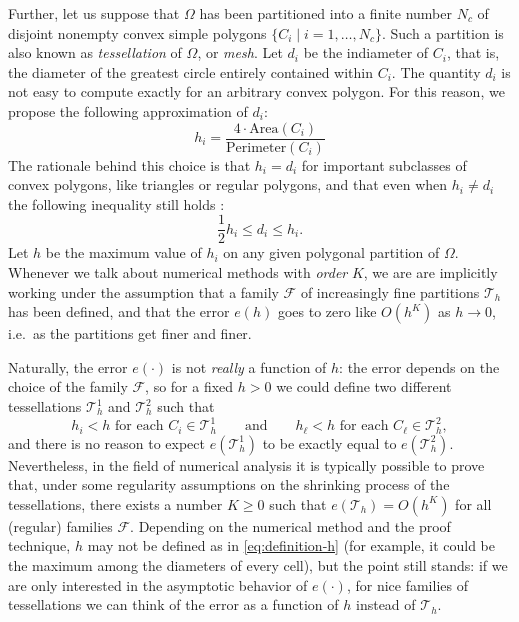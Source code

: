 Further, let us suppose that $\Omega$ has been partitioned into a
finite number $N_{c}$ of disjoint nonempty convex simple polygons
$\{C_{i} \mid i=1,\dots, N_{c}\}$. Such a partition is also known as
\emph{tessellation} of $\Omega$, or \emph{mesh}.
Let $d_{i}$ be the indiameter of $C_{i}$, that is, the diameter of the
greatest circle entirely contained within $C_{i}$.
The quantity $d_{i}$ is not easy to compute exactly for an arbitrary
convex polygon. For this reason, we propose the following
approximation of $d_{i}$:
\begin{equation} \label{eq:definition-h}
h_{i} = \frac{4 \cdot \text{Area}(C_{i})}{\text{Perimeter}(C_{i})}
\end{equation}
The rationale behind this choice is that $h_{i} = d_{i}$ for important subclasses
of convex polygons, like triangles or regular polygons, and that even
when $h_{i} \neq d_{i}$ the following inequality still holds
\cite{scott2000inequalities}:
\[
\frac{1}{2}h_{i}\leq d_{i} \leq h_{i}.
\]
Let $h$ be the maximum value of $h_{i}$ on any
given polygonal partition of $\Omega$.
Whenever we talk about numerical methods with \emph{order} $K$,
we are are implicitly working under the assumption
that a family $\mathcal{F}$ of increasingly fine partitions $\mathcal{T}_{h}$
has been defined, and that the error $e(h)$ goes to zero like $O(h^K)$
as $h \to 0$, i.e.\ as the partitions get finer and finer.

Naturally, the error $e(\cdot)$ is not \emph{really} a function of $h$:
the error depends on the choice of the family $\mathcal{F}$,
so for a fixed $h > 0$ we could define two different tessellations
$\mathcal{T}_{h}^1$ and $\mathcal{T}_{h}^2$ such that
\[
h_i < h \text{ for each $C_i \in \mathcal{T}_{h}^1$}
\qquad \text{and} \qquad
h_\ell < h \text{ for each $C_\ell \in \mathcal{T}_{h}^2$},
\]
and there is no reason to expect $e(\mathcal{T}_{h}^1)$ to be
exactly equal to $e(\mathcal{T}_{h}^2)$.
Nevertheless, in the field of numerical analysis it is typically
possible to prove that, under some regularity assumptions on the
shrinking process of the tessellations, there exists a number $K \geq 0$
such that $e(\mathcal{T}_{h}) = O(h^K)$ for all (regular) families
$\mathcal{F}$. Depending on the numerical method and the proof technique,
$h$ may not be defined as in \eqref{eq:definition-h}
(for example, it could be the maximum among the diameters of every cell),
but the point still stands: if we are only interested in the asymptotic
behavior of $e(\cdot)$, for nice families of tessellations we can think
of the error as a function of $h$ instead of $\mathcal{T}_{h}$.

